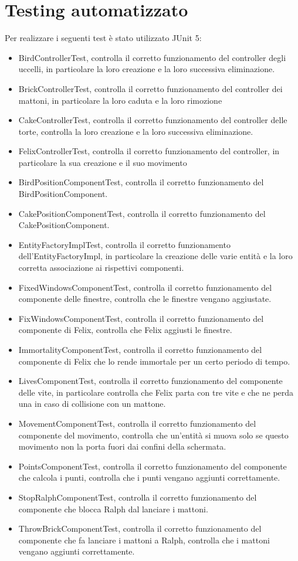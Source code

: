\documentclass[a4paper,12pt]{report}
\begin{document}
\section{Testing automatizzato}
Per realizzare i seguenti test è stato utilizzato JUnit 5: 
\begin{itemize}
\item BirdControllerTest, controlla il corretto funzionamento del controller degli uccelli, in particolare la loro creazione e la loro successiva eliminazione.
\item BrickControllerTest, controlla il corretto funzionamento del controller dei mattoni, in particolare la loro caduta e la loro rimozione
\item CakeControllerTest, controlla il corretto funzionamento del controller delle torte, controlla la loro creazione e la loro successiva eliminazione.
\item FelixControllerTest, controlla il corretto funzionamento del controller, in particolare la sua creazione e il suo movimento
\item BirdPositionComponentTest, controlla il corretto funzionamento del BirdPositionComponent.
\item CakePositionComponentTest, controlla il corretto funzionamento del CakePositionComponent.
\item EntityFactoryImplTest, controlla il corretto funzionamento dell'EntityFactoryImpl, in particolare la creazione delle varie entità e la loro corretta associazione ai rispettivi componenti.
\item FixedWindowsComponentTest, controlla il corretto funzionamento del componente delle finestre, controlla che le finestre vengano aggiustate.
\item FixWindowsComponentTest, controlla il corretto funzionamento del componente di Felix, controlla che Felix aggiusti le finestre.
\item ImmortalityComponentTest, controlla il corretto funzionamento del componente di Felix che lo rende immortale per un certo periodo di tempo.
\item LivesComponentTest, controlla il corretto funzionamento del componente delle vite, in particolare controlla che Felix parta con tre vite e che ne perda una in caso di collisione con un mattone.
\item MovementComponentTest, controlla il corretto funzionamento del componente del movimento, controlla che un'entità si muova solo se questo movimento non la porta fuori dai confini della schermata.
\item PointsComponentTest, controlla il corretto funzionamento del componente che calcola i punti, controlla che i punti vengano aggiunti correttamente.
\item StopRalphComponentTest, controlla il corretto funzionamento del componente che blocca Ralph dal lanciare i mattoni. 
\item ThrowBrickComponentTest, controlla il corretto funzionamento del componente che fa lanciare i mattoni a Ralph, controlla che i mattoni vengano aggiunti correttamente. 
\end{itemize}
\end{document}

